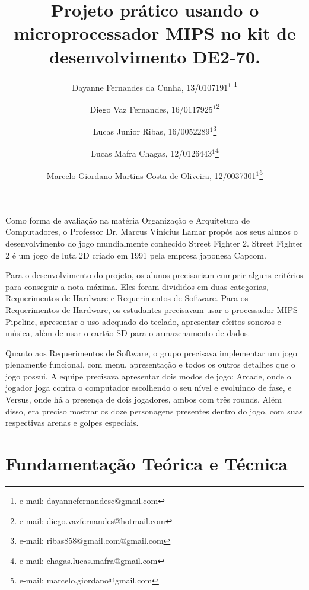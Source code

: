 \documentclass{vgtc}                          %
\title{Projeto prático usando o microprocessador MIPS no kit de desenvolvimento DE2-70.}
\author{Dayanne Fernandes da Cunha, 13/0107191$^{1}$ \thanks{e-mail: dayannefernandesc@gmail.com}%
\and Diego Vaz Fernandes, 16/0117925$^{1}$\thanks{e-mail: diego.vazfernandes@hotmail.com}%
\and Lucas Junior Ribas, 16/0052289$^{1}$\thanks{e-mail: ribas858@gmail.com@gmail.com}
\and Lucas Mafra Chagas, 12/0126443$^{1}$\thanks{e-mail: chagas.lucas.mafra@gmail.com}
\and Marcelo Giordano Martins Costa de Oliveira, 12/0037301$^{1}$\thanks{e-mail: marcelo.giordano@gmail.com}}
\affiliation{\scriptsize $^{1}$Universidade de Brasília, Departamento de Ciência da Computação, Brasil}
\begin{document}


\maketitle


Como forma de avaliação na matéria Organização e Arquitetura de Computadores, o Professor Dr. Marcus Vinicius Lamar propós aos seus alunos o desenvolvimento do jogo mundialmente conhecido Street Fighter 2. Street Fighter 2 é um jogo de luta 2D criado em 1991 pela empresa japonesa Capcom.

Para o desenvolvimento do projeto, os alunos precisariam cumprir alguns critérios para conseguir a nota máxima. Eles foram divididos em duas categorias, Requerimentos de Hardware e Requerimentos de Software. Para os Requerimentos de Hardware, os estudantes precisavam usar o processador MIPS Pipeline, apresentar o uso adequado do teclado, apresentar efeitos sonoros e música, além de usar o cartão SD para o armazenamento de dados.

Quanto aos Requerimentos de Software, o grupo precisava implementar um jogo plenamente funcional, com menu, apresentação e todos os outros detalhes que o jogo possui. A equipe precisava apresentar dois modos de jogo: Arcade, onde o jogador joga contra o computador escolhendo o seu nível e evoluindo de fase, e Versus, onde há a presença de dois jogadores, ambos com três rounds. Além disso, era preciso mostrar os doze personagens presentes dentro do jogo, com suas respectivas arenas e golpes especiais. 


\section{Fundamentação Teórica e Técnica}
\end{document}
